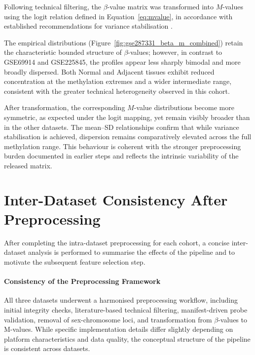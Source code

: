 Following technical filtering, the $\beta$-value matrix was transformed into
$M$-values using the logit relation defined in Equation~\eqref{eq:mvalue},
in accordance with established recommendations for variance stabilisation
\cite{Du2010, Triche2013, Fortin2017}.

The empirical distributions (Figure~\ref{fig:gse287331_beta_m_combined})
retain the characteristic bounded structure of $\beta$-values; however,
in contrast to GSE69914 and GSE225845, the profiles appear less sharply
bimodal and more broadly dispersed. Both Normal and Adjacent tissues exhibit
reduced concentration at the methylation extremes and a wider intermediate
range, consistent with the greater technical heterogeneity observed in this
cohort.

After transformation, the corresponding $M$-value distributions become more
symmetric, as expected under the logit mapping, yet remain visibly broader
than in the other datasets. The mean--SD relationships confirm that while
variance stabilisation is achieved, dispersion remains comparatively elevated
across the full methylation range. This behaviour is coherent with the
stronger preprocessing burden documented in earlier steps and reflects the
intrinsic variability of the released matrix.



\section{Inter-Dataset Consistency After Preprocessing}
\label{sec:inter_preprocessing}

After completing the intra-dataset preprocessing for each cohort, a concise
inter-dataset analysis is performed to summarise the effects of the pipeline
and to motivate the subsequent feature selection step.

\paragraph{Consistency of the Preprocessing Framework}
All three datasets underwent a harmonised preprocessing workflow, including
initial integrity checks, literature-based technical filtering, manifest-driven
probe validation, removal of sex-chromosome loci, and transformation from
$\beta$-values to M-values. While specific implementation details differ slightly
depending on platform characteristics and data quality, the conceptual structure
of the pipeline is consistent across datasets.

